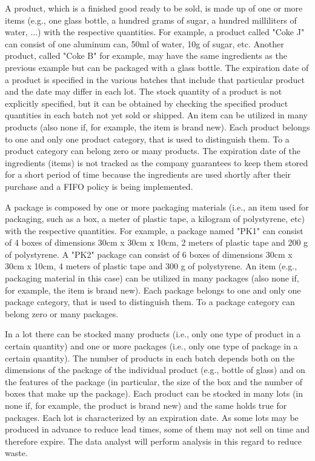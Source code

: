 A product, which is a finished good ready to be sold, is made up of one or more items (e.g., one glass bottle, a hundred grams of sugar, a hundred milliliters of water, ...) with the respective quantities. For example, a product called "Coke J" can consist of one aluminum can, 50ml of water, 10g of sugar, etc. Another product, called "Coke B" for example, may have the same ingredients as the previous example but can be packaged with a glass bottle. The expiration date of a product is specified in the various batches that include that particular product and the date may differ in each lot. The stock quantity of a product is not explicitly specified, but it can be obtained by checking the specified product quantities in each batch not yet sold or shipped. An item can be utilized in many products (also none if, for example, the item is brand new). Each product belongs to one and only one product category, that is used to distinguish them. To a product category can belong zero or many products. The expiration date of the ingredients (items) is not tracked as the company guarantees to keep them stored for a short period of time because the ingredients are used shortly after their purchase and a FIFO policy is being implemented.

A package is composed by one or more packaging materials (i.e., an item used for packaging, such as a box, a meter of plastic tape, a kilogram of polystyrene, etc) with the respective quantities. For example, a package named "PK1" can consist of 4 boxes of dimensions 30cm x 30cm x 10cm, 2 meters of plastic tape and 200 g of polystyrene. A "PK2" package can consist of 6 boxes of dimensions 30cm x 30cm x 10cm, 4 meters of plastic tape and 300 g of polystyrene. An item (e.g., packaging material in this case) can be utilized in many packages (also none if, for example, the item is brand new). Each package belongs to one and only one package category, that is used to distinguish them. To a package category can belong zero or many packages.

In a lot there can be stocked many products (i.e., only one type of product in a certain quantity) and one or more packages (i.e., only one type of package in a certain quantity). The number of products in each batch depends both on the dimensions of the package of the individual product (e.g., bottle of glass) and on the features of the package (in particular, the size of the box and the number of boxes that make up the package). Each product can be stocked in many lots (in none if, for example, the product is brand new) and the same holds true for packages. Each lot is characterized by an expiration date. As some lots may be produced in advance to reduce lead times, some of them may not sell on time and therefore expire. The data analyst will perform analysis in this regard to reduce waste.

